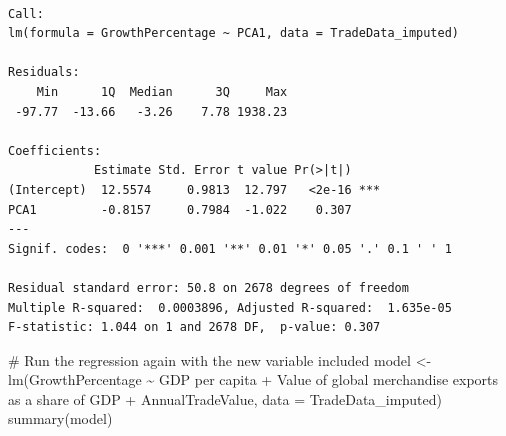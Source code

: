 \documentclass[
  10pt,
]{article}
\newenvironment{Shaded}{\begin{snugshade}}{\end{snugshade}}
\newcommand{\AttributeTok}[1]{\textcolor[rgb]{0.40,0.45,0.13}{#1}}
\newcommand{\CommentTok}[1]{\textcolor[rgb]{0.37,0.37,0.37}{#1}}
\newcommand{\ConstantTok}[1]{\textcolor[rgb]{0.56,0.35,0.01}{#1}}
\newcommand{\DecValTok}[1]{\textcolor[rgb]{0.68,0.00,0.00}{#1}}
\newcommand{\FunctionTok}[1]{\textcolor[rgb]{0.28,0.35,0.67}{#1}}
\newcommand{\NormalTok}[1]{\textcolor[rgb]{0.00,0.23,0.31}{#1}}
\newcommand{\OtherTok}[1]{\textcolor[rgb]{0.00,0.23,0.31}{#1}}
\newcommand{\SpecialCharTok}[1]{\textcolor[rgb]{0.37,0.37,0.37}{#1}}
\newcommand{\StringTok}[1]{\textcolor[rgb]{0.13,0.47,0.30}{#1}}
\begin{document}
\begin{Shaded}
\end{Shaded}

\begin{verbatim}

Call:
lm(formula = GrowthPercentage ~ PCA1, data = TradeData_imputed)

Residuals:
    Min      1Q  Median      3Q     Max 
 -97.77  -13.66   -3.26    7.78 1938.23 

Coefficients:
            Estimate Std. Error t value Pr(>|t|)    
(Intercept)  12.5574     0.9813  12.797   <2e-16 ***
PCA1         -0.8157     0.7984  -1.022    0.307    
---
Signif. codes:  0 '***' 0.001 '**' 0.01 '*' 0.05 '.' 0.1 ' ' 1

Residual standard error: 50.8 on 2678 degrees of freedom
Multiple R-squared:  0.0003896, Adjusted R-squared:  1.635e-05 
F-statistic: 1.044 on 1 and 2678 DF,  p-value: 0.307
\end{verbatim}

\begin{Shaded}
\begin{Highlighting}[]
\CommentTok{\# Run the regression again with the new variable included}
\NormalTok{model }\OtherTok{\textless{}{-}} \FunctionTok{lm}\NormalTok{(GrowthPercentage }\SpecialCharTok{\textasciitilde{}} \StringTok{\textasciigrave{}}\AttributeTok{GDP per capita}\StringTok{\textasciigrave{}} \SpecialCharTok{+} \StringTok{\textasciigrave{}}\AttributeTok{Value of global merchandise exports as a share of GDP}\StringTok{\textasciigrave{}} \SpecialCharTok{+}\NormalTok{ AnnualTradeValue, }\AttributeTok{data =}\NormalTok{ TradeData\_imputed)}
\FunctionTok{summary}\NormalTok{(model)}
\end{Highlighting}
\end{Shaded}
\end{document}
